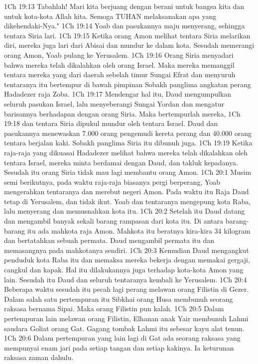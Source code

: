 1Ch 19:13  Tabahlah! Mari kita berjuang dengan berani untuk bangsa kita dan untuk kota-kota Allah kita. Semoga TUHAN melaksanakan apa yang dikehendaki-Nya."
1Ch 19:14  Yoab dan pasukannya maju menyerang, sehingga tentara Siria lari.
1Ch 19:15  Ketika orang Amon melihat tentara Siria melarikan diri, mereka juga lari dari Abisai dan mundur ke dalam kota. Sesudah memerangi orang Amon, Yoab pulang ke Yerusalem.
1Ch 19:16  Orang Siria menyadari bahwa mereka telah dikalahkan oleh orang Israel. Maka mereka memanggil tentara mereka yang dari daerah sebelah timur Sungai Efrat dan menyuruh tentaranya itu bertempur di bawah pimpinan Sobakh panglima angkatan perang Hadadezer raja Zoba.
1Ch 19:17  Mendengar hal itu, Daud mengumpulkan seluruh pasukan Israel, lalu menyeberangi Sungai Yordan dan mengatur barisannya berhadapan dengan orang Siria. Maka bertempurlah mereka,
1Ch 19:18  dan tentara Siria dipukul mundur oleh tentara Israel. Daud dan pasukannya menewaskan 7.000 orang pengemudi kereta perang dan 40.000 orang tentara berjalan kaki. Sobakh panglima Siria itu dibunuh juga.
1Ch 19:19  Ketika raja-raja yang dikuasai Hadadezer melihat bahwa mereka telah dikalahkan oleh tentara Israel, mereka minta berdamai dengan Daud, dan takluk kepadanya. Sesudah itu orang Siria tidak mau lagi membantu orang Amon.
1Ch 20:1  Musim semi berikutnya, pada waktu raja-raja biasanya pergi berperang, Yoab mengerahkan tentaranya dan merebut negeri Amon. Pada waktu itu Raja Daud tetap di Yerusalem, dan tidak ikut. Yoab dan tentaranya mengepung kota Raba, lalu menyerang dan memusnahkan kota itu.
1Ch 20:2  Setelah itu Daud datang dan mengambil banyak sekali barang rampasan dari kota itu. Di antara barang-barang itu ada mahkota raja Amon. Mahkota itu beratnya kira-kira 34 kilogram dan bertatahkan sebuah permata. Daud mengambil permata itu dan memasangnya pada mahkotanya sendiri.
1Ch 20:3  Kemudian Daud mengangkut penduduk kota Raba itu dan memaksa mereka bekerja dengan memakai gergaji, cangkul dan kapak. Hal itu dilakukannya juga terhadap kota-kota Amon yang lain. Sesudah itu Daud dan seluruh tentaranya kembali ke Yerusalem.
1Ch 20:4  Beberapa waktu sesudah itu pecah lagi perang melawan orang Filistin di Gezer. Dalam salah satu pertempuran itu Sibkhai orang Husa membunuh seorang raksasa bernama Sipai. Maka orang Filistin pun kalah.
1Ch 20:5  Dalam pertempuran lain melawan orang Filistin, Elhanan anak Yair membunuh Lahmi saudara Goliat orang Gat. Gagang tombak Lahmi itu sebesar kayu alat tenun.
1Ch 20:6  Dalam pertempuran yang lain lagi di Gat ada seorang raksasa yang mempunyai enam jari pada setiap tangan dan setiap kakinya. Ia keturunan raksasa zaman dahulu.
